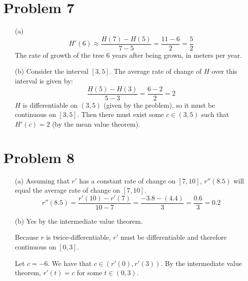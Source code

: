 \documentclass{article}
\newcommand*{\problem}[1]{\section*{Problem #1}}
\begin{document}
\problem{7}
\begin{itemize}
	\item[(a)]
	\begin{equation*}
		H'(6)\approx\frac{H(7)-H(5)}{7-5}=\frac{11-6}{2}=\frac{5}{2}
	\end{equation*}
	The rate of growth of the tree $6$ years after being grown, in meters per year.

	\item[(b)]
	Consider the interval $[3,5]$. The average rate of change of $H$ over this interval is given by:
	\begin{equation*}
		\frac{H(5)-H(3)}{5-3}=\frac{6-2}{2}=2
	\end{equation*}
	$H$ is differentiable on $(3,5)$ (given by the problem), so it must be continuous on $[3,5]$. Then there must exist some $c\in(3,5)$ such that $H'(c)=2$ (by the mean value theorem).
\end{itemize}

\problem{8}
\begin{itemize}
	\item[(a)]
	Assuming that $r'$ has a constant rate of change on $[7,10]$, $r''(8.5)$ will equal the average rate of change on $[7,10]$.
	\begin{equation*}
		r''(8.5)=\frac{r'(10)-r'(7)}{10-7}=\frac{-3.8-(4.4)}{3}=\frac{0.6}{3}=0.2
	\end{equation*}

	\item[(b)]
	Yes by the intermediate value theorem.
	
	Because $r$ is twice-differentiable, $r'$ must be differentiable and therefore continuous on $[0,3]$.

	Let $c=-6$. We have that $c\in(r'(0),r'(3))$. By the intermediate value theorem, $r'(t)=c$ for some $t\in(0,3)$.
\end{itemize}
\end{document}
